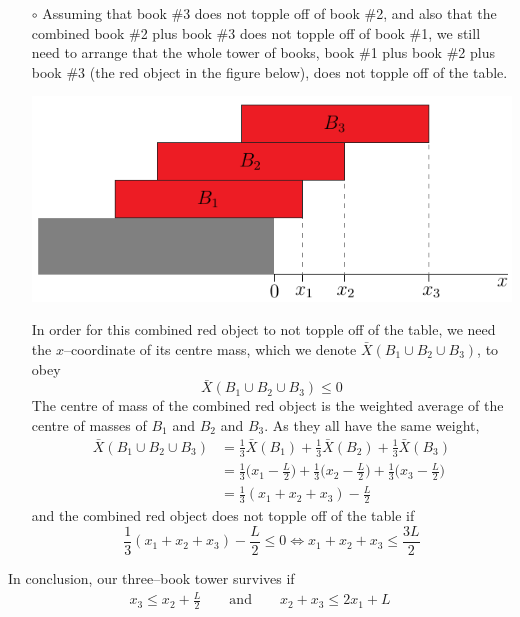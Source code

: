 \begin{itemize}
\begin{itemize}
\item[$\circ$]
Assuming that book \#3 does not topple off of book \#2, and also
that the combined book \#2 plus book \#3 does not topple off of book \#1,
we still need to arrange that the whole tower of books, book \#1 plus
book \#2 plus book \#3 (the red object in the figure below), does not
topple off of the table.
\begin{efig}
\begin{center}
     \includegraphics{bookStackV3c.pdf}
\end{center}
\end{efig}
In order for this combined red object to not topple off of the table,
we need the $x$--coordinate of its centre mass, which we denote
$\bar X(B_1\cup B_2\cup B_3)$, to obey
\begin{equation*}
\bar X(B_1\cup B_2\cup B_3) \le 0
\end{equation*}
The centre of mass of the combined red object is the weighted
average  of the centre of masses of $B_1$ and $B_2$ and $B_3$.
As they all have the same weight,
\begin{align*}
\bar X(B_1\cup B_2\cup B_3) &= \frac{1}{3}\bar X(B_1) +\frac{1}{3}\bar X(B_2)
                                +\frac{1}{3}\bar X(B_3) \\
  &=  \frac{1}{3}\Big(x_1-\frac{L}{2}\Big)
     +\frac{1}{3}\Big(x_2-\frac{L}{2}\Big)
     +\frac{1}{3}\Big(x_3-\frac{L}{2}\Big) \\
&= \frac{1}{3}(x_1+x_2+x_3) -\frac{L}{2}
\end{align*}
and the combined red object does not topple off of the table if
\begin{equation*}
\frac{1}{3}(x_1+ x_2+x_3) -\frac{L}{2} \le 0
\iff
x_1+ x_2+x_3\le \frac{3L}{2}
\end{equation*}
\end{itemize}
In conclusion, our three--book tower survives if
\begin{align*}
x_3\le x_2+\frac{L}{2}\qquad\text{and}\qquad x_2+x_3\le 2x_1 + L

\end{align*}
\end{itemize}
